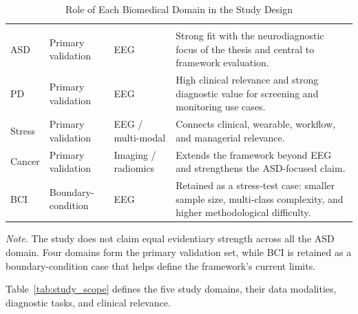 {\tablestripes\tablefontsize
\begin{xltabular}{\textwidth}{@{} >{\raggedright\arraybackslash}p{1.5cm} >{\raggedright\arraybackslash}p{1.6cm} >{\raggedright\arraybackslash}p{1.5cm} L @{}}
\caption[Role of Each Biomedical Domain in the Study Design]{Role of Each Biomedical Domain in the Study Design}\label{tab:domain_role_hierarchy} \\
\toprule
{} &  &  &  \\
\midrule
\endfirsthead
\toprule
{} &  &  &  \\
\midrule
\endhead
\bottomrule
\endlastfoot
ASD & Primary validation & EEG & Strong fit with the neurodiagnostic focus of the thesis and central to framework evaluation. \\
\addlinespace
PD & Primary validation & EEG & High clinical relevance and strong diagnostic value for screening and monitoring use cases. \\
\addlinespace
Stress & Primary validation & EEG / multi-modal & Connects clinical, wearable, workflow, and managerial relevance. \\
\addlinespace
Cancer & Primary validation & Imaging / radiomics & Extends the framework beyond EEG and strengthens the ASD-focused claim. \\
\addlinespace
BCI & Boundary-condition & EEG & Retained as a stress-test case: smaller sample size, multi-class complexity, and higher methodological difficulty. \\
\end{xltabular}}
\vspace{0.5em}
\noindent\textit{Note.} The study does not claim equal evidentiary strength across all the ASD domain. Four domains form the primary validation set, while BCI is retained as a boundary-condition case that helps define the framework's current limits.
\fi %

Table~\ref{tab:study_scope} defines the five study domains, their data modalities, diagnostic tasks, and clinical relevance.



